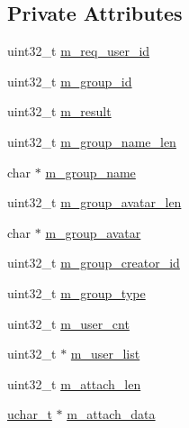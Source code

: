 \subsection*{Private Attributes}
\begin{DoxyCompactItemize}
\item 
uint32\+\_\+t \hyperlink{class_c_im_pdu_group_user_list_response_a8001a87b8532abbd8cc7641b0dd2967c}{m\+\_\+req\+\_\+user\+\_\+id}
\item 
uint32\+\_\+t \hyperlink{class_c_im_pdu_group_user_list_response_a2a3c8e783fcccf15bd0833b034c78c1b}{m\+\_\+group\+\_\+id}
\item 
uint32\+\_\+t \hyperlink{class_c_im_pdu_group_user_list_response_a6a49f4d0c4233fce2bc2ebb446ed1ec0}{m\+\_\+result}
\item 
uint32\+\_\+t \hyperlink{class_c_im_pdu_group_user_list_response_afa829577ab05d02dcc21d1ecd01d8731}{m\+\_\+group\+\_\+name\+\_\+len}
\item 
char $\ast$ \hyperlink{class_c_im_pdu_group_user_list_response_ae53170a4655b84a159f0d19d87ad326a}{m\+\_\+group\+\_\+name}
\item 
uint32\+\_\+t \hyperlink{class_c_im_pdu_group_user_list_response_a2bbb275e87a7efbfd870f82f36197aac}{m\+\_\+group\+\_\+avatar\+\_\+len}
\item 
char $\ast$ \hyperlink{class_c_im_pdu_group_user_list_response_a371a3466723099d72abb310f11a8e763}{m\+\_\+group\+\_\+avatar}
\item 
uint32\+\_\+t \hyperlink{class_c_im_pdu_group_user_list_response_a408180e9fd3a28713af488add0b72e62}{m\+\_\+group\+\_\+creator\+\_\+id}
\item 
uint32\+\_\+t \hyperlink{class_c_im_pdu_group_user_list_response_a3e5de7d3a542e60e51d8d22ad5ee6635}{m\+\_\+group\+\_\+type}
\item 
uint32\+\_\+t \hyperlink{class_c_im_pdu_group_user_list_response_a6c57abfbcb281ca1e9beb854b49b1c55}{m\+\_\+user\+\_\+cnt}
\item 
uint32\+\_\+t $\ast$ \hyperlink{class_c_im_pdu_group_user_list_response_a73a90cf93c8d46517d5413f21bc051f7}{m\+\_\+user\+\_\+list}
\item 
uint32\+\_\+t \hyperlink{class_c_im_pdu_group_user_list_response_ae9edc680d3188d0408d4306565fe3c07}{m\+\_\+attach\+\_\+len}
\item 
\hyperlink{base_2ostype_8h_a124ea0f8f4a23a0a286b5582137f0b8d}{uchar\+\_\+t} $\ast$ \hyperlink{class_c_im_pdu_group_user_list_response_a82a5e02b42cb7d3fdff9775130e3d43c}{m\+\_\+attach\+\_\+data}
\end{DoxyCompactItemize}
